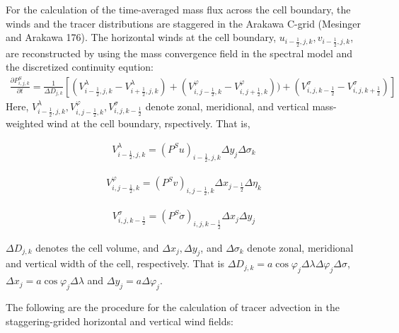 For the calculation of the time-averaged mass flux across the cell boundary, the winds and the tracer distributions are staggered in the Arakawa C-grid (Mesinger and Arakawa 176). The horizontal winds
at the cell boundary, \(u_{i-\frac{1}{2},j,k}, v_{i-\frac{1}{2},j,k}\), are reconstructed by using the mass convergence field in the spectral model and the discretized continuity eqution:
\begin{eqnarray}\frac{\partial P^{S}_{i,j,k} }{\partial t}=\frac{1}{\Delta D_{j,k}}[(V^{\lambda}_{i-\frac{1}{2},j,k}-V^{\lambda}_{i+\frac{1}{2},j,k})+(V^{\varphi}_{i,j-\frac{1}{2},k}-V^{\varphi}_{i,j+\frac{1}{2},k}))+(V^{\sigma}_{i,j,k-\frac{1}{2}}-V^{\sigma}_{i,j,k+\frac{1}{2}})]\end{eqnarray}
Here, \(V^{\lambda}_{i-\frac{1}{2},j,k}, V^{\varphi}_{i,j-\frac{1}{2},k}, V^{\sigma}_{i,j,k-\frac{1}{2}}\) denote zonal, meridional, and vertical mass-weighted wind at the cell boundary, rspectively.
That is,

\begin{eqnarray}
V^{\lambda}_{i-\frac{1}{2},j,k}=(P^{S}u)_{i-\frac{1}{2},j,k} \Delta y_{j} \Delta \sigma_{k}
\end{eqnarray}

\begin{eqnarray}
V^{\varphi}_{i,j-\frac{1}{2},k}=(P^{S}v)_{i,j-\frac{1}{2},k} \Delta x_{j-\frac{1}{2}} \Delta \eta_{k}
\end{eqnarray}

\begin{eqnarray}
V^{\sigma}_{i,j,k-\frac{1}{2}}=(P^{S}\dot{\sigma})_{i,j,k-\frac{1}{2}} \Delta x_{j} \Delta y_{j}
\end{eqnarray}

\(\Delta D_{j,k}\) denotes the cell volume, and \(\Delta x_{j}, \Delta y_{j}\), and \(\Delta \sigma_{k}\) denote zonal, meridional and vertical width of the cell, respectively. That is
\(\Delta D_{j,k}=a \cos \varphi_{j}\Delta \lambda \Delta \varphi_{j} \Delta \sigma\), \(\Delta x_{j}=a \cos \varphi_{j} \Delta \lambda\) and \(\Delta y_{j}=a \Delta \varphi_{j}\).

The following are the procedure for the calculation of tracer advection in the staggering-grided horizontal and vertical wind fields:

